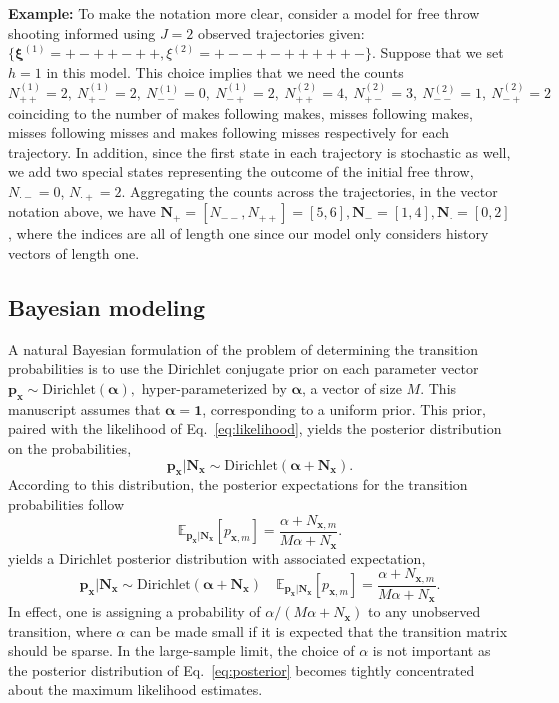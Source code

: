 \documentclass{IOS-Book-Article}
\newcommand{\bN}{\mathbf{N}}
\newcommand{\bx}{\mathbf{x}}
\newcommand{\bp}{\mathbf{p}}
\begin{document}
\textbf{Example: }
To make the notation more clear, consider a model for free throw shooting informed using $J=2$ observed trajectories given: $\{\boldsymbol\xi^{(1)} = +-++-++, \xi^{(2)} =  +--+-+++++-\}$. Suppose that
we set $h=1$ in this model. This choice implies that we need the counts $N_{++}^{(1)}=2,\ N^{(1)}_{+-}=2,\ N^{(1)}_{--}=0,\  N^{(1)}_{-+}=2,\ N_{++}^{(2)}=4,\ N^{(2)}_{+-}=3,\ N^{(2)}_{--}=1,\ N^{(2)}_{-+}=2$ coinciding to the number of makes following makes, misses following makes, misses following misses and makes following misses respectively for each trajectory. In addition, since the first state in each trajectory is stochastic as well, we add two special states representing the outcome of
the initial free throw, $N_{\cdot -} = 0$, $N_{\cdot +} = 2$. Aggregating the counts across the trajectories, in the vector notation above, we have $\mathbf{N}_+ = [N_{--}, N_{++}]= [5,6], \mathbf{N}_-=[1,4], \mathbf{N}_\cdot = [0,2]$, where the indices 
are all of length one since our model only considers history vectors of length one.


\subsection{Bayesian modeling}

A natural Bayesian formulation of the
problem of determining the transition probabilities is to use the Dirichlet conjugate prior
on each parameter vector
$
\mathbf{p}_{\bx} \sim \mathrm{Dirichlet}(\boldsymbol\alpha),
$
 hyper-parameterized by $\boldsymbol\alpha$, a vector of size $M$. This manuscript assumes that $\boldsymbol\alpha=\mathbf{1}$, corresponding to a uniform prior. This prior, paired with the likelihood of Eq.~\ref{eq:likelihood}, 
 yields the posterior distribution on the probabilities,
\begin{equation}
\mathbf{p}_{\bx}  \vert \mathbf{N}_{\bx} \sim \mathrm{Dirichlet}(\boldsymbol\alpha + \mathbf{N}_{\bx} ).
\label{eq:posterior}
\end{equation}
According to this distribution, the posterior expectations for the transition probabilities follow
\begin{equation}
\mathbb{E}_{\bp_\bx\vert\bN_\bx} [p_{\bx,m}] = \frac{\alpha + N_{\bx,m}}{M\alpha+ N_{\bx}}.
\end{equation}
yields a  Dirichlet posterior distribution
 with associated expectation,
\begin{equation}
\mathbf{p}_{\bx}  \vert \mathbf{N}_{\bx} \sim \mathrm{Dirichlet}(\boldsymbol\alpha + \mathbf{N}_{\bx} ) \quad \mathbb{E}_{\bp_\bx\vert\bN_\bx} [p_{\bx,m}] = \frac{\alpha + N_{\bx,m}}{M\alpha+ N_{\bx}}.\label{eq:posterior}
\end{equation}
In effect, one is assigning a probability of $\alpha/(M\alpha+N_{\bx})$ to any unobserved transition, where $\alpha$ can be made small if it is expected that the transition matrix should be sparse.   In the large-sample limit, the choice of $\alpha$ is not important as the posterior distribution of Eq.~\ref{eq:posterior}  becomes tightly concentrated about the maximum likelihood estimates.
\end{document}
